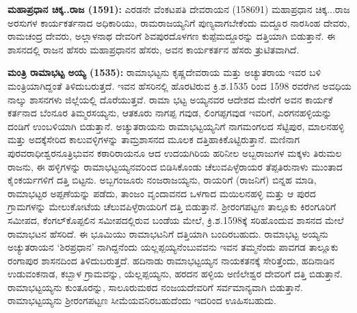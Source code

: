 \vskip -1pt

\textbf{ಮಹಾಪ್ರಧಾನ ಚಿಕ್ಕ..ರಾಜ (1591):} ಎರಡನೇ ವೆಂಕಟಪತಿ ದೇವರಾಯನ (1586\enginline{-}91) ಮಹಾಪ್ರಧಾನ ಚಿಕ್ಕ...ರಾಜ ಅರಸುಗಳ ಕಾರ್ಯಕರ್ತನಾದ ಅಧಿಕಾರಿಯು, ರಾಮರಾಜಯ್ಯನಿಗೆ ಪುಣ್ಯವಾಗಬೇಕೆಂದು ಮದ್ದೂರ ನಾರಸಿಂಹ ದೇವರು, ರಾಮಚಂದ್ರ ದೇವರು, ಅಲ್ಲಾಳನಾಥ ದೇವರಿಗೆ ಶಿವಪುರದೊಳಗಣ ಕುಪ್ಪೆಮದ್ದೂರನ್ನು ದತ್ತಿಯಾಗಿ ಬಿಡುತ್ತಾನೆ. ಈ ಶಾಸನದಲ್ಲಿ ರಾಜನ ಹೆಸರು ಮಹಾಪ್ರಧಾನನ ಹೆಸರು, ಅವನ ಕಾರ್ಯಕರ್ತನ ಹೆಸರು ತ್ರುಟಿತವಾಗಿದೆ.

\vskip -1pt

\textbf{ಮಂತ್ರಿ ರಾಮಾಭಟ್ಟ ಅಯ್ಯ (1535):} ರಾಮಾಭಟ್ಟನು ಕೃಷ್ಣದೇವರಾಯ ಮತ್ತು ಅಚ್ಯುತರಾಯ ಇವರ ಬಳಿ ಮಂತ್ರಿಯಾಗಿದ್ದಂತೆ ತಿಳಿದುಬರುತ್ತದೆ. ಇವನ ಹೆಸರಿನಲ್ಲಿ ಹೊರಟಿರುವ ಕ್ರಿ.ಶ.1535 ರಿಂದ 1598 ರವರೆಗಿನ ಅವಧಿಯ ನಾಲ್ಕು ಶಾಸನಗಳು ಜಿಲ್ಲೆಯಲ್ಲಿ ದೊರೆಯುತ್ತವೆ. ರಾಮಾ ಭಟ್ಟ ಅಯ್ಯನವರ ಆದೇಶದ ಮೇರೆಗೆ ಅವನ ಕಾರ್ಯಕೆ ಕರ್ತನಾದ ಬೆಂನೂರ ತಿಮ್ಮರಸಯ್ಯನು, ಆತಕೂರು ನಾಗಪ್ಪ ಗವುಡ, ಲಿಂಗಪ್ಪಗವುಡ ಇವರಿಗೆ, ಎರಗನಹಳ್ಳಿಯನ್ನು ದಂಡಿಗೆ ಉಂಬಳಿ\-ಯಾಗಿ ಬಿಡುತ್ತಾನೆ. ಅಚ್ಯುತರಾಯನು ರಾಮಾಭಟ್ಟಯ್ಯನಿಗೆ ನಾಗಮಂಗಲದ ಸೆಟ್ಟಿಪುರ, ಮಾಲನಹಳ್ಳಿ ಮತ್ತು ಅದಕ್ಕೆ\break ಸೇರಿದ ಕಾಲುವಳ್ಳಿಗಳನ್ನು ತಾಮ್ರಶಾಸನದ ಮೂಲಕ ದತ್ತಿಹಾಕಿಕೊಟ್ಟಿರುತ್ತಾನೆ. ಮಣಿನಾಗ ಪುರವರಾಧೀಶ್ವರನೂ\break ತ್ರಿಭುವನ ಕಠಾರಿರಾಯನೂ ಆದ ಉದಯಗಿರಿಯ ಹರಿನೀಲ ಅಬ್ಬರಾಜುಗಳ ಮಕ್ಕಳು ತಿರುಮಲ ರಾಜನು, ಈ ಹಳ್ಳಿಗಳನ್ನು ರಾಮಾಭಟ್ಟಯ್ಯನವರಿಂದ ಬಿಡಿಸಿಕೊಂಡು ಚೆಲುವಪಿಳ್ಳೆರಾಯರ ತೆಪ್ಪತಿರುನಾಳು ಮುಂತಾದ ಕೈಂಕರ್ಯಗಳಿಗೆ ದತ್ತಿ ಬಿಟ್ಟನು. ಅಬ್ಬಗಂಜೂರು ನಂಜರಾಜಯ್ಯನು, ರಾಯರಿಗೆ (ರಾಜನಿಗೆ) ಬಿನ್ನಹ ಮಾಡಿ, ರಾಮಾಭಟ್ಟರ ಅಪ್ಪಣೆಯನ್ನು ಪಡೆದು, ತಾಂಜಂ ವೃಂದಾವನದ ಒಳಗಾದ ಮಯಿಲನಹಳ್ಳಿ ಮತ್ತು ಆ ಪುರದ ಗ್ರಾಮಗಳನ್ನು ಮೇಲುಕೋಟೆಯ ಚೆಲುವಪಿಳ್ಳೆರಾಯರಿಗೆ ದತ್ತಿ ಬಿಡುತ್ತಾನೆ. ಶ‍್ರೀರಂಗಪಟ್ಟಣ ತಾಲ್ಲೂಕು ಕಿರಂಗೂರಿಗೆ ಸಮೀಪದ, ಕೆಂಗಲ್​ಕೊಪ್ಪಲಿನ ಸಮೀಪದಲ್ಲಿರುವ ಬಂಡೆಯ ಮೇಲೆ, ಕ್ರಿ.ಶ.1598ಕ್ಕೆ ಸರಿಹೊಂದುವ ಶಾಸನದ ಮೇಲೆ ರಾಮಾಭಟನ ಹೆಸರಿದೆ. ಈ ಭೂಮಿಯು ರಾಮಾಭಟನಿಗೆ ದತ್ತಿಯಾಗಿ ಬಂದಿರಬಹುದು. ರಾಮಾಭಟ್ಟ ಅಯ್ಯನು ಅಚ್ಯುತರಾಯನ ‘ಶಿರಪ್ರಧಾನ’ ನಾಗಿದ್ದನೆಂದು ಯಲ್ಲಪ್ಪಯ್ಯನೆಂಬುವವನು ಇವನ ತಮ್ಮನೆಂದು ಪಾವಗಡ ತಾಲ್ಲೂಕು ರಂಗಾಪುರ ಶಾಸನದಿಂದ ತಿಳಿದುಬರುತ್ತದೆ. ಹದಿನಾಡು ರಾಮಾಭಟ್ಟಯ್ಯನ ನಾಯಕತನಕ್ಕೆ ಸೇರಿತ್ತೆಂದು, ಹದಿನಾಡಿನ ಉಡುವಂಕನಾಡ, ಕಬ್ಬಾಳ ಗ್ರಾಮವನ್ನು, ಯೆಲ್ಲಪ್ಪಯ್ಯನು, ಹರದನ ಹಳ್ಳಿಯ ಅಣಿಲೇಶ್ವರ ದೇವರಿಗೆ ದತ್ತಿ ಬಿಡುತ್ತಾನೆ. ರಾಮಾಭಟ್ಟಯ್ಯನು ಕುಂತೂರನ್ನು, ಸಾಲೂರುಮಠದ ನಂಜಯದೇವರಿಗೆ ಸರ್ವಮಾನ್ಯವಾಗಿ ಬಿಡುತ್ತಾನೆ. ರಾಮಾಭಟ್ಟಯ್ಯನು ಶ‍್ರೀರಂಗಪಟ್ಟಣ ಸೀಮೆಯವನಿರಬಹುದೆಂದು ಇದರಿಂದ ಊಹಿಸಬಹುದು.

